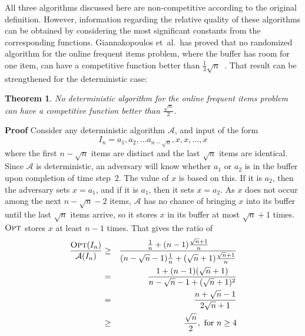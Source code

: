 \documentclass[11pt]{article}
\newtheorem{xtheorem}{Theorem}
\newenvironment{theorem}{\begin{xtheorem}\rm}{\end{xtheorem}}
\newenvironment{proof}{\begin{trivlist}\item[]{\bf Proof }}{\hspace*{\fill}\raisebox{-1pt}{\boldmath$\Box$}\end{trivlist}}
\newcommand{\opt}{{\ensuremath{\textsc{Opt}}}\xspace}
\newcommand{\algA}{{\ensuremath{\mathcal{A}}}\xspace}
\begin{document}
All three algorithms discussed here are non-competitive according to
the original definition.
However, information regarding the relative quality of these algorithms
can be obtained by considering the most significant constants
from the corresponding functions.
Giannakopoulos et~al.\ has proved that no randomized algorithm for the
online frequent items problem, where the buffer has room for one item,
can have a competitive function better than
$\frac{1}{3}\sqrt{n}$~\cite{Giannakopoulos12}.
That result can be strengthened for the deterministic case:
\begin{theorem}\label{thm:comp_all}
No deterministic algorithm for the online frequent items problem can have a competitive function better than $\frac{\sqrt{n}}{2}$.
\end{theorem}
\begin{proof}
Consider any deterministic algorithm $\mathcal{A}$, and input of the form
$$I_n = a_1, a_2, \ldots a_{n-\sqrt{n}}, x, x, \ldots, x$$ where the
first $n-\sqrt{n}$ items are distinct and the last $\sqrt{n}$
items are identical.
Since \algA is deterministic, an adversary will know whether $a_1$
or $a_2$ is in the buffer upon completion of time step~2.
The value of $x$ is based on this.
If it is $a_2$, then the adversary sets $x=a_1$, and if it is $a_1$, then
it sets $x=a_2$.
As $x$ does not occur among the next $n-\sqrt{n}-2$ items,
$\mathcal{A}$ has no chance of bringing $x$ into its buffer until
the last $\sqrt{n}$ items arrive, so it
stores $x$ in its buffer at most $\sqrt{n}+1$ times.
$\opt$ stores $x$ at least $n-1$ times.
That gives the ratio of
\begin{eqnarray}
 \frac{\opt (I_n)}{\mathcal{A}(I_n)} &\geq& \frac{\frac{1}{n} + (n-1)\frac{\sqrt{n} + 1}{n}}{(n-\sqrt{n} - 1)\frac{1}{n} +
(\sqrt{n} + 1)\frac{\sqrt{n} + 1}{n}} \nonumber
\\
&=& \frac{1 + (n-1)(\sqrt{n} +1)}{n- \sqrt{n} -1 + (\sqrt{n} + 1)^2} \nonumber
\\
&=& \frac{n + \sqrt{n} -1}{2\sqrt{n} + 1} \nonumber
\\
&\geq& \frac{\sqrt{n}}{2}, \nonumber \mbox{    for $n\geq 4$}
\end{eqnarray}
\end{proof}
\end{document}
